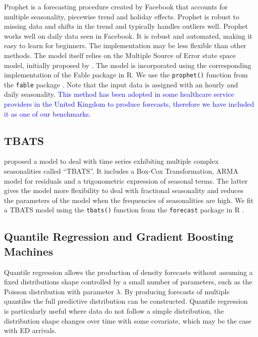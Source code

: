 \documentclass[]{elsarticle} %
\begin{document}
Prophet is a forecasting procedure created by Facebook
\citep{taylor2018forecasting} that accounts for multiple seasonality,
piecewise trend and holiday effects. Prophet is robust to missing data
and shifts in the trend and typically handles outliers well. Prophet
works well on daily data seen in Facebook. It is robust and automated,
making it easy to learn for beginners. The implementation may be less
flexible than other methods. The model itself relies on the Multiple
Source of Error state space model, initially proposed by \citet{Kalman1960}.
The model is incorporated using the corresponding implementation of the
Fable package in R. We use the \texttt{prophet()} function from the \texttt{fable}
package \citep{fable2020}. Note that the input data is assigned with an
hourly and daily seasonality. \textcolor{blue}{This method has been adopted in some healthcare service providers in the United Kingdom to produce forecasts, therefore we have included it as one of our
benchmarks.}

\hypertarget{tbats}{%
\subsection{TBATS}\label{tbats}}

\citet{de2011forecasting} proposed a model to deal with time series exhibiting
multiple complex seasonalities called ``TBATS''. It includes a Box-Cox
Transformation, ARMA model for residuals and a trigonometric expression
of seasonal terms. The latter gives the model more flexibility to deal
with fractional seasonality and reduces the parameters of the model when
the frequencies of seasonalities are high. We fit a TBATS model using
the \texttt{tbats()} function from the \texttt{forecast} package in R
\citep{forecastpackage2020}.

\hypertarget{quantile-regression-and-gradient-boosting-machines}{%
\subsection{Quantile Regression and Gradient Boosting Machines}\label{quantile-regression-and-gradient-boosting-machines}}

Quantile regression allows the production of density forecasts without
assuming a fixed distributions shape controlled by a small number of
parameters, such as the Poisson distribution with parameter \(\lambda\).
By producing forecasts of multiple quantiles the full predictive
distribution can be constructed. Quantile regression is particularly
useful where data do not follow a simple distribution, the
distribution shape changes over time with some covariate, which may
be the case with ED arrivals.
\end{document}
